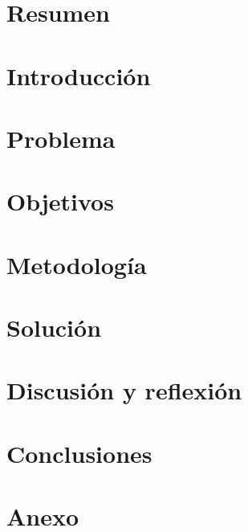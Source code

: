 \documentclass[11pt]{article}
\begin{document}
	
	\tableofcontents
	\pagebreak
	
	
	\section{Resumen}
	
	\pagebreak
	
	\section{Introducción}
	
	\pagebreak
	
	\section{Problema}
	
	\pagebreak
	
	\section{Objetivos}
	
	\pagebreak
	
	\section{Metodología}
	
	\pagebreak
	
	\section{Solución}
	
	\pagebreak
	
	
	\pagebreak
	
	
	\pagebreak
	
	
	\pagebreak
	
	\section{Discusión y reflexión}
	
	\pagebreak
	
	
	\pagebreak
	
	
	\pagebreak
	
	\section{Conclusiones}
	
	\pagebreak
	
	\section{Anexo}
	
\end{document}
